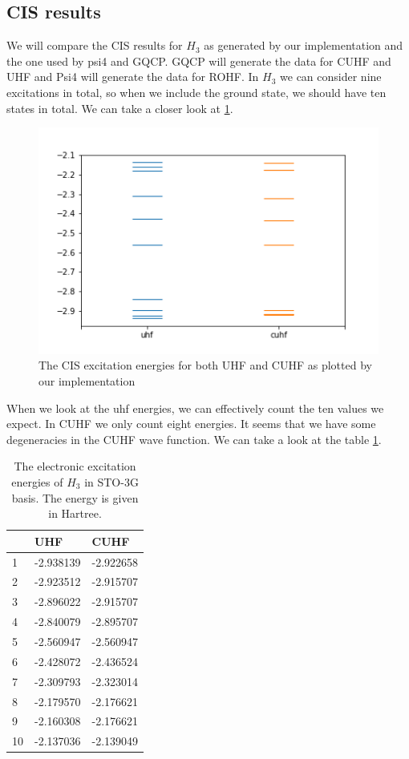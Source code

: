 \documentclass[twoside,twocolumn,9pt]{article}
\begin{document}
\subsection{CIS results}
\label{subsec:cis}
We will compare the CIS results for $H_3$ as generated by our implementation and the one used by psi4 and GQCP. GQCP will generate the data for CUHF and UHF and Psi4 will generate
the data for ROHF. In $H_3$ we can consider nine excitations in total, so when we include the ground state, we should have ten states in total. We can take a closer look at
\ref{fig:h3_cis}.
\begin{center}
  \begin{figure}[h]
    \includegraphics[width=\linewidth]{./../notes/figures/h3_cis.png}
    \caption{The CIS excitation energies for both UHF and CUHF as plotted by our implementation}
    \label{fig:h3_cis}
  \end{figure}
\end{center}
When we look at the uhf energies, we can effectively count the ten values we expect. In CUHF we only count eight energies. It seems that we have some degeneracies in the CUHF
wave function. We can take a look at the table \ref{tab:excits}.
\begin{table}[h]
  \caption{The electronic excitation energies of $H_3$ in STO-3G basis. The energy is given in Hartree.}
  \label{tab:excits}
  \begin{tabular}{l|l|l}
       & UHF       & CUHF      \\
    \hline
    1  & -2.938139 & -2.922658 \\
    2  & -2.923512 & -2.915707 \\
    3  & -2.896022 & -2.915707 \\
    4  & -2.840079 & -2.895707 \\
    5  & -2.560947 & -2.560947 \\
    6  & -2.428072 & -2.436524 \\
    7  & -2.309793 & -2.323014 \\
    8  & -2.179570 & -2.176621 \\
    9  & -2.160308 & -2.176621 \\
    10 & -2.137036 & -2.139049
  \end{tabular}
\end{table}
\end{document}
